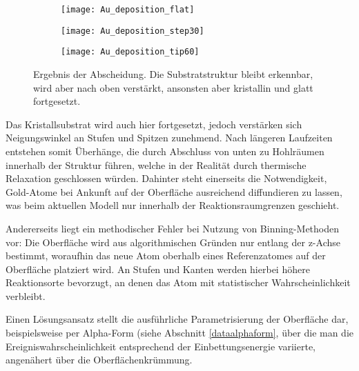 \begin{figure}[bt]
  \captionsetup[subfigure]{singlelinecheck=false}
  \def\subfigwidth{0.31\textwidth}
  \begin{subfigure}[t]{\subfigwidth}
    \texttt{[image: Au\_deposition\_flat]}
    \label{fig:copperdepositions-a}
  \end{subfigure}
  \hfill
  \begin{subfigure}[t]{\subfigwidth}
    \texttt{[image: Au\_deposition\_step30]}
    \label{fig:copperdepositions-b}
  \end{subfigure}
  \hfill
  \begin{subfigure}[t]{\subfigwidth}
    \texttt{[image: Au\_deposition\_tip60]}
    \label{fig:copperdepositions-c}
  \end{subfigure}
  \caption[Abscheidung auf strukturierten Substraten]{
    Ergebnis der Abscheidung.
    Die Substratstruktur bleibt erkennbar, wird aber nach oben verstärkt, ansonsten aber kristallin und glatt fortgesetzt.
  }
  \label{fig:copperdepositions}
\end{figure}

Das Kristallsubstrat wird auch hier fortgesetzt, jedoch verstärken sich Neigungswinkel an Stufen und Spitzen zunehmend.
Nach längeren Laufzeiten entstehen somit Überhänge, die durch Abschluss von unten zu Hohlräumen innerhalb der Struktur führen, welche in der Realität durch thermische Relaxation geschlossen würden.
Dahinter steht einerseits die Notwendigkeit, Gold-Atome bei Ankunft auf der Oberfläche ausreichend diffundieren zu lassen, was beim aktuellen Modell nur innerhalb der Reaktionsraumgrenzen geschieht.

Andererseits liegt ein methodischer Fehler bei Nutzung von Binning-Methoden vor:
Die Oberfläche wird aus algorithmischen Gründen nur entlang der z-Achse bestimmt, woraufhin das neue Atom oberhalb eines Referenzatomes auf der Oberfläche platziert wird.
An Stufen und Kanten werden hierbei höhere Reaktionsorte bevorzugt, an denen das Atom mit statistischer Wahrscheinlichkeit verbleibt.

Einen Lösungsansatz stellt die ausführliche Parametrisierung der Oberfläche dar, beispielsweise per Alpha-Form (siehe Abschnitt \ref{dataalphaform}, über die man die Ereigniswahrscheinlichkeit entsprechend der Einbettungsenergie variierte, angenähert über die Oberflächenkrümmung.
